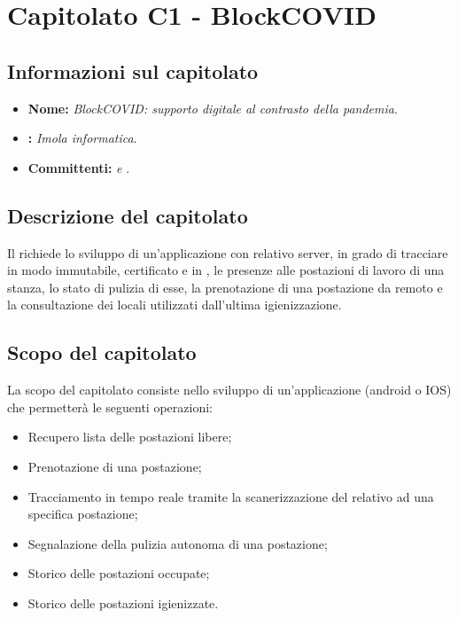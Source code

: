 \section{Capitolato C1 - BlockCOVID}\label{C1}
\subsection{Informazioni sul capitolato}
\begin{itemize}
	\item \textbf{Nome:} \textit{BlockCOVID: supporto digitale al contrasto della pandemia}.
	\item \textbf{:} \textit{Imola informatica}.
	\item \textbf{Committenti:} \textit{\VT{} e \CR{}}.
\end{itemize}

\subsection{Descrizione del capitolato}
Il  richiede lo sviluppo di un'applicazione con relativo server, in grado di tracciare in modo immutabile, certificato e in , le presenze alle postazioni di lavoro di una stanza, lo stato di pulizia di esse, la prenotazione di una postazione da remoto e la consultazione dei locali utilizzati dall'ultima igienizzazione.

\subsection{Scopo del capitolato}
La scopo del capitolato consiste nello sviluppo di un'applicazione (android o IOS) che permetterà le seguenti operazioni:
\begin{itemize}
	\item Recupero lista delle postazioni libere;
	\item Prenotazione di una postazione;
	\item Tracciamento in tempo reale tramite la scanerizzazione del  relativo ad una specifica postazione;
	\item Segnalazione della pulizia autonoma di una postazione;
	\item Storico delle postazioni occupate;
	\item Storico delle postazioni igienizzate.
\end{itemize}

